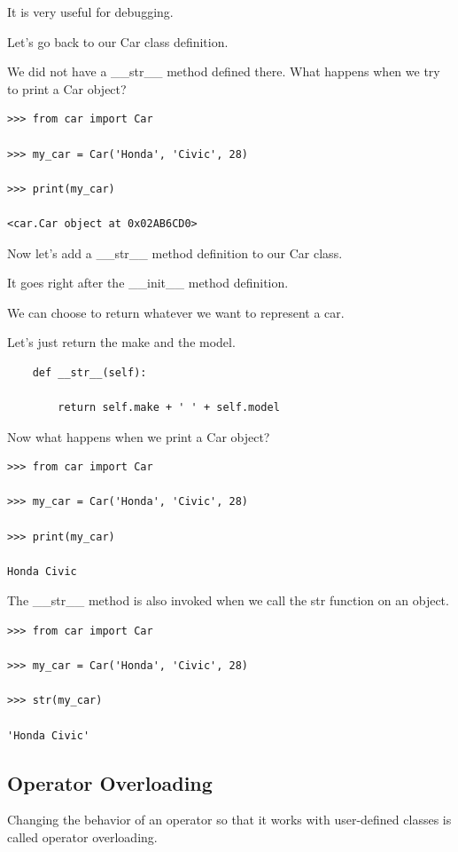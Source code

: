 \documentclass{article}
\begin{document}
It is very useful for debugging.

Let’s go back to our Car class definition.

We did not have a {\_}{\_}str{\_}{\_} method defined there.  What happens when we try to print a Car object?

\begin{lstlisting}
>>> from car import Car

>>> my_car = Car('Honda', 'Civic', 28)

>>> print(my_car)

<car.Car object at 0x02AB6CD0>
\end{lstlisting}

Now let’s add a {\_}{\_}str{\_}{\_} method definition to our Car class.

It goes right after the {\_}{\_}init{\_}{\_} method definition.

We can choose to return whatever we want to represent a car. 

Let’s just return the make and the model.

\begin{lstlisting}
    def __str__(self):

        return self.make + ' ' + self.model
\end{lstlisting}

Now what happens when we print a Car object?

\begin{lstlisting}
>>> from car import Car

>>> my_car = Car('Honda', 'Civic', 28)

>>> print(my_car)

Honda Civic
\end{lstlisting}

The {\_}{\_}str{\_}{\_} method is also invoked when we call the str function on an object.

\begin{lstlisting}
>>> from car import Car

>>> my_car = Car('Honda', 'Civic', 28)

>>> str(my_car)

'Honda Civic'
\end{lstlisting}

\subsection{Operator Overloading}

Changing the behavior of an operator so that it works with user-defined classes is called operator overloading. 
\end{document}

